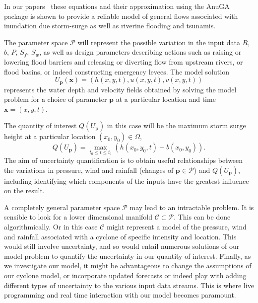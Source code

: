 In our papers~\parencite{anugamanual,nielsen2005hydrodynamic}  these
equations and their approximation using the  AnuGA package is shown to provide a reliable
model of general flows associated with inundation due storm-surge as well as riverine flooding and tsunamis.

The parameter space $\mathcal{P}$ will represent the possible variation in the input data $R$, $b$, $P$, $S_f$, $S_w$, as well as design parameters describing actions such as raising or lowering flood barriers and releasing or diverting flow from upstream rivers, or flood basins, or indeed constructing emergency levees. 
The model solution 
$$
U_{\mathbf{p}} (\mathbf{x})  = (  h(x,y,t) , u(x,y,t) ,  v(x,y,t) )
$$
represents the water depth and velocity fields obtained by solving the model problem for a choice of parameter $\mathbf{p}$ at a particular location and time $\mathbf{x} = (x,y,t)$.

The quantity of interest $Q(U_{\mathbf{p}})$ in this case will be the maximum storm surge height at a particular location $(x_0, y_0) \in \Omega$,
$$ 
Q(U_{\mathbf{p}})  = \max_{t_0 \leq t \leq t_1} \left( h(x_0,y_0,t) + b(x_0,y_0) \right).
$$
The aim of  uncertainty quantification is to obtain useful relationships between the variations in pressure, wind and rainfall (changes of $\mathbf{p} \in \mathcal{P}$) and $Q(U_{\mathbf{p}})$, including identifying which components of the inputs  have the greatest influence on the result. 

A completely general parameter space $\mathcal{P}$ may lead to an intractable problem. It is sensible to look for a lower dimensional manifold $\mathcal{C} \subset \mathcal{P}$. This can be done algorithmically. Or in this case $\mathcal{C}$ might represent a model of the pressure, wind and rainfall associated with a cyclone of specific intensity and location. This would still involve uncertainty, and so would entail numerous solutions of our model problem to quantify the uncertainty in our quantity of interest. Finally, as we investigate our model, it might be advantageous to change the assumptions of our cyclone model, or incorporate updated forecasts or indeed play with adding different types of uncertainty to the various input data streams. This is where live programming and real time interaction with our model becomes paramount. 